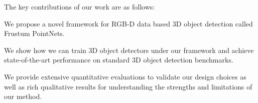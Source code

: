 The key contributions of our work are as follows:
\bitem
    \item We propose a novel framework for RGB-D data based 3D object detection called Frustum PointNets.
    \item We show how we can train 3D object detectors under our framework and achieve state-of-the-art performance on standard 3D object detection benchmarks.
    \item We provide extensive quantitative evaluations to validate our design choices as well as rich qualitative results for understanding the strengths and limitations of our method.
\eitem




